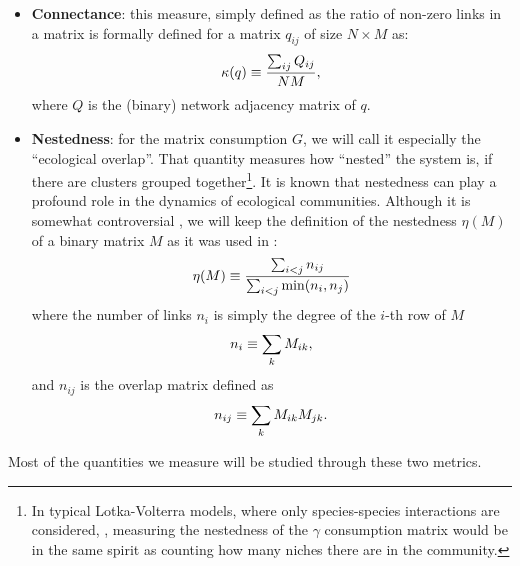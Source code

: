 \documentclass[12pt, titlepage]{report}
\begin{document}
\begin{itemize}
\item \textbf{Connectance}: this measure, simply defined as the ratio of non-zero links in a matrix %
is formally defined for a matrix $q_{ij}$  of size $N\times M$ as:
\begin{equation}
\kappa(q)\equiv \frac{\sum_{ij} Q_{ij}}{NM},
\end{equation}
where $Q$ is the (binary) network adjacency matrix of $q$.


\item \textbf{Nestedness}: for the matrix consumption $G$, we will call it especially the ``ecological overlap''. That quantity measures how ``nested'' the system is, \ie if there are clusters grouped together\footnote{In typical Lotka-Volterra models, where only species-species interactions are considered, \eg \cite{iannelli_introduction_2014}, measuring the nestedness of the $\gamma$ consumption matrix would be in the same spirit as counting how many niches there are in the community.}. It is known \cite{bastolla_architecture_2009, pascual-garcia_mutualism_2017} that nestedness can play a profound role in the dynamics of ecological communities. Although it is somewhat controversial \cite{jonhson_factors_2013}, we will keep the definition of the nestedness $\eta(M)$ of a binary matrix $M$ as it was used in \cite{bastolla_architecture_2009}:
\begin{equation}
\eta(M)\equiv \frac{\sum_{i<j} n_{ij}}{\sum_{i < j} \min(n_i, n_j)}
\end{equation}
where the number of links $n_i$ is simply the degree of the $i$-th row of $M$
\begin{equation}
n_i \equiv \sum_k M_{ik},
\end{equation}
and $n_{ij}$ is the overlap matrix defined as
\begin{equation}
n_{ij}\equiv \sum_k M_{ik}M_{jk}.
\end{equation}
\end{itemize}
Most of the quantities we measure will be studied through these two metrics.
\end{document}
